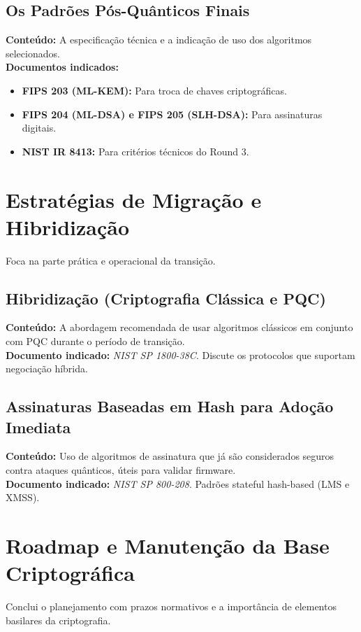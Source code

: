 \subsection{Os Padrões Pós-Quânticos Finais}
\textbf{Conteúdo:} A especificação técnica e a indicação de uso dos algoritmos selecionados.\\
\textbf{Documentos indicados:}
\begin{itemize}
    \item \textbf{FIPS 203 (ML-KEM):} Para troca de chaves criptográficas.
    \item \textbf{FIPS 204 (ML-DSA) e FIPS 205 (SLH-DSA):} Para assinaturas digitais.
    \item \textbf{NIST IR 8413:} Para critérios técnicos do Round 3.
\end{itemize}

\section{Estratégias de Migração e Hibridização}
Foca na parte prática e operacional da transição.

\subsection{Hibridização (Criptografia Clássica e PQC)}
\textbf{Conteúdo:} A abordagem recomendada de usar algoritmos clássicos em conjunto com PQC durante o período de transição.\\
\textbf{Documento indicado:} \textit{NIST SP 1800-38C}. Discute os protocolos que suportam negociação híbrida.

\subsection{Assinaturas Baseadas em Hash para Adoção Imediata}
\textbf{Conteúdo:} Uso de algoritmos de assinatura que já são considerados seguros contra ataques quânticos, úteis para validar firmware.\\
\textbf{Documento indicado:} \textit{NIST SP 800-208}. Padrões stateful hash-based (LMS e XMSS).

\section{Roadmap e Manutenção da Base Criptográfica}
Conclui o planejamento com prazos normativos e a importância de elementos basilares da criptografia.

